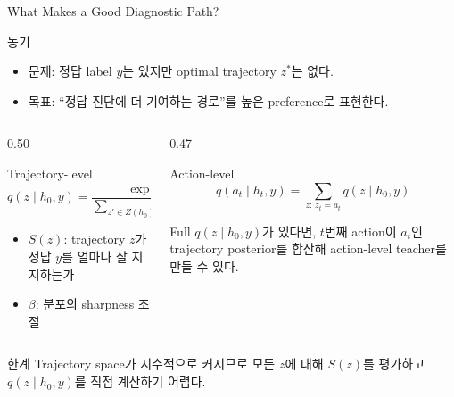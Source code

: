 \documentclass[11pt,notheorems,hyperref={pdfauthor=whatever}]{beamer}
\begin{document}
\begin{frame}[t]{What Makes a Good Diagnostic Path?}
\small
\begin{block}{동기}
\footnotesize
\begin{itemize}
  \item 문제: 정답 label \(y\)는 있지만 optimal trajectory \(z^*\)는 없다.
  \item 목표: ``정답 진단에 더 기여하는 경로''를 높은 preference로 표현한다.
\end{itemize}
\end{block}
\vspace{0.45em}
\begin{columns}[T,onlytextwidth]
\begin{column}{0.50\textwidth}
\begin{alertblock}{Trajectory-level}
\centering
\[
q(z\mid h_0,y)=
\frac{\exp(\beta S(z))}
{\sum_{z'\in Z(h_0)}\exp(\beta S(z'))}
\]
\end{alertblock}
\footnotesize
\begin{itemize}
  \item \(S(z)\): trajectory \(z\)가 정답 \(y\)를 얼마나 잘 지지하는가
  \item \(\beta\): 분포의 sharpness 조절
\end{itemize}
\end{column}
\begin{column}{0.47\textwidth}
\begin{block}{Action-level}
\centering
\[
q(a_t\mid h_t,y)=
\sum_{z:\,z_t=a_t}q(z\mid h_0,y)
\]
\end{block}
\footnotesize
Full \(q(z\mid h_0,y)\)가 있다면, \(t\)번째 action이 \(a_t\)인 trajectory posterior를 합산해 action-level teacher를 만들 수 있다.
\end{column}
\end{columns}
\vspace{0.55em}
\begin{alertblock}{한계}
\footnotesize
Trajectory space가 지수적으로 커지므로 모든 \(z\)에 대해 \(S(z)\)를 평가하고
\(q(z\mid h_0,y)\)를 직접 계산하기 어렵다.
\end{alertblock}
\end{frame}
\end{document}
